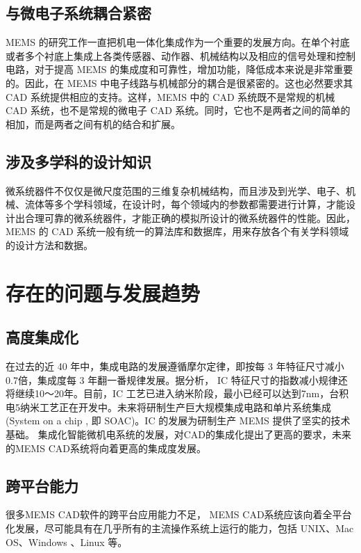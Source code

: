 \documentclass[no-math]{YangThesis}
\begin{document}
\subsection{与微电子系统耦合紧密}

MEMS 的研究工作一直把机电一体化集成作为一个重要的发展方向。在单个衬底或者多个衬底上集成上各类传感器、动作器、机械结构以及相应的信号处理和控制电路，对于提高 MEMS 的集成度和可靠性，增加功能，降低成本来说是非常重要的。因此，在 MEMS 中电子线路与机械部分的耦合是很紧密的。这也必然要求其 CAD 系统提供相应的支持。这样，MEMS 中的 CAD 系统既不是常规的机械 CAD 系统，也不是常规的微电子 CAD 系统。同时，它也不是两者之间的简单的相加，而是两者之间有机的结合和扩展。

\subsection{涉及多学科的设计知识}

微系统器件不仅仅是微尺度范围的三维复杂机械结构，而且涉及到光学、电子、机械、流体等多个学科领域，在设计时，每个领域内的参数都需要进行计算，才能设计出合理可靠的微系统器件，才能正确的模拟所设计的微系统器件的性能。因此，MEMS 的 CAD 系统一般有统一的算法库和数据库，用来存放各个有关学科领域的设计方法和数据。

\newpage
\section{存在的问题与发展趋势}

\subsection{高度集成化}

在过去的近 40 年中，集成电路的发展遵循摩尔定律，即按每 3 年特征尺寸减小0.7倍，集成度每 3 年翻一番规律发展\cite{bibc60}。据分析， IC 特征尺寸的指数减小规律还将继续10～20年。目前，IC 工艺已进入纳米阶段，最小已经可以达到7nm，台积电5纳米工艺正在开发中\cite{bibc61}。未来将研制生产巨大规模集成电路和单片系统集成 (System on a chip , 即 SOAC)。IC 的发展为研制生产 MEMS 提供了坚实的技术基础。
集成化智能微机电系统的发展，对CAD的集成化提出了更高的要求，未来的MEMS CAD系统将向着更高的集成度发展。

\subsection{跨平台能力}

很多MEMS CAD软件的跨平台应用能力不足， MEMS CAD系统应该向着全平台化发展，尽可能具有在几乎所有的主流操作系统上运行的能力，包括 UNIX、Mac OS、Windows 、Linux 等。
\end{document}
